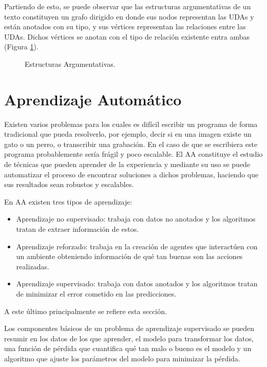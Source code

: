 \documentclass[a4paper,11pt,twocolumn,twoside]{article}
\begin{document}
Partiendo de esto, se puede observar que las estructuras argumentativas de un texto constituyen un grafo dirigido 
en donde sus nodos representan las UDAs y están anotados con su tipo, y sus vértices representan las 
relaciones entre las UDAs. Dichos vértices se anotan con el tipo de relación existente entra ambas 
(Figura \ref{fig:arg_struct}).

\begin{figure}[h]
	\centering
	
	\caption{Estructuras Argumentativas.}
	\label{fig:arg_struct}
\end{figure}

\section{Aprendizaje Automático}

Existen varios problemas para los cuales es difícil escribir un programa de forma tradicional que pueda
resolverlo, por ejemplo, decir si en una imagen existe un gato o un perro, o transcribir una grabación. En el caso
de que se escribiera este programa probablemente sería frágil y poco escalable. El AA constituye el 
estudio de técnicas que pueden aprender de la experiencia \cite{d2l} y mediante su uso 
se puede automatizar el proceso de encontrar soluciones a dichos problemas, haciendo que sus resultados sean 
robustos y escalables. 

En AA existen tres tipos de aprendizaje:
\begin{itemize}
	\item Aprendizaje no supervisado: trabaja con datos no anotados y los algoritmos tratan de
	      extraer información de estos.
	\item Aprendizaje reforzado: trabaja en la creación de agentes que interactúen con
	      un ambiente obteniendo información de qué tan buenas son las acciones realizadas.
	\item Aprendizaje supervisado: trabaja con datos anotados y los algoritmos tratan de minimizar
	      el error cometido en las predicciones.
\end{itemize}
A este último principalmente se refiere esta sección.

Los componentes básicos de un problema de aprendizaje supervisado se pueden resumir en los datos de los que 
aprender, el modelo para transformar los datos, una función de pérdida que cuantifica qué tan malo o bueno es el 
modelo y un algoritmo que ajuste los parámetros del modelo para minimizar la pérdida.
\end{document}
